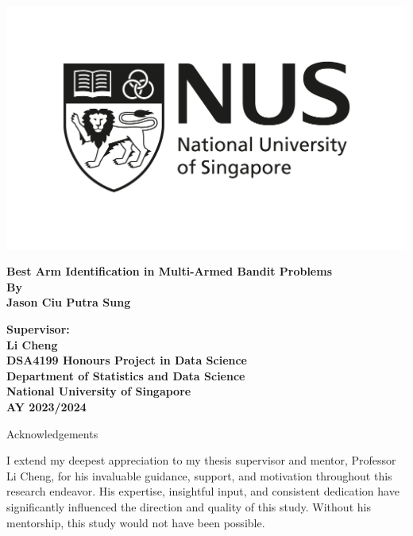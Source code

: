 \documentclass[a4paper, 12pt]{article}
\theoremstyle{definition}
\begin{document}
\begin{titlepage}
 \centering
 \includegraphics[scale=0.45]{figures/nuslogo.jpg}\par\vspace{0.5cm}
 \textbf{\LARGE Best Arm Identification in Multi-Armed Bandit Problems} \\
 \vspace{1cm}
 \textbf{\large By} \\
 \textbf{\large Jason Ciu Putra Sung}
 \vspace*{3cm}
 
\textbf{\large Supervisor:} \\
\textbf{\large Li Cheng} \\
\vspace{2.5cm}
\textbf{\large DSA4199 Honours Project in Data Science} \\
\textbf{\large Department of Statistics and Data Science}\\
\textbf{\large National University of Singapore} \\
\textbf{\large AY 2023/2024} \\
\end{titlepage}



\thispagestyle{empty}
\vspace{1em}
\begin{center}
{\Large Acknowledgements}
\end{center}
I extend my deepest appreciation to my thesis supervisor and mentor, Professor Li Cheng, for his invaluable guidance, support, and motivation throughout this research endeavor. His expertise, insightful input, and consistent dedication have significantly influenced the direction and quality of this study. Without his mentorship, this study would not have been possible.
\end{document}
